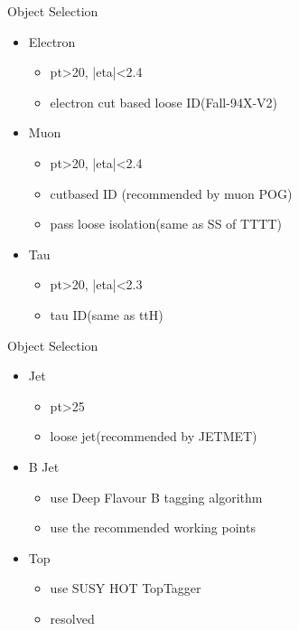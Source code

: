 \documentclass{beamer}
\begin{document}


\begin{frame}{Object Selection}
  \begin{itemize}
  \item
    Electron 
    \begin{itemize}
    \item
        pt>20, |eta|<2.4
    \item
        electron cut based loose ID(Fall-94X-V2)
    \end{itemize}
  \item
    Muon
    \begin{itemize}
    \item
        pt>20, |eta|<2.4
    \item
        cutbased ID (recommended by muon POG)
    \item
        pass loose isolation(same as SS of TTTT)
    \end{itemize}
  \item
    Tau
    \begin{itemize}
    \item
        pt>20, |eta|<2.3
    \item
        tau ID(same as ttH)
    \end{itemize}
  \end{itemize}
\end{frame}


\begin{frame}{Object Selection}
  \begin{itemize}
  \item
    Jet
    \begin{itemize}
    \item
        pt>25
    \item
        loose jet(recommended by JETMET)
    \end{itemize}
  \item
     B Jet
     \begin{itemize}
        \item
            use Deep Flavour B tagging algorithm 
        \item 
            use the recommended working points
     \end{itemize}
  \item
      Top 
    \begin{itemize}
    \item
        use SUSY HOT TopTagger 
    \item 
        resolved
    \end{itemize}

  \end{itemize}
\end{frame}
\end{document}
